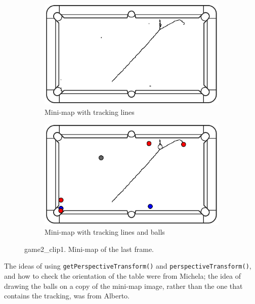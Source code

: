 \begin{figure}[H]
	\centering
	\begin{subfigure}[b]{0.40\textwidth}
		\centering
		\includegraphics[width=\textwidth]{images/Minimap/g2_c1minimap_with_track.jpg}
		\caption{Mini-map with tracking lines}
		\label{fig:game2_clip1_tracking}
	\end{subfigure}
	\begin{subfigure}[b]{0.40\textwidth}
		\centering
		\includegraphics[width=\textwidth]{images/Minimap/g2_c1_minimap_with_balls.jpg}
		\caption{Mini-map with tracking lines and balls}
		\label{fig:game2_clip1_balls}
	\end{subfigure}
	\caption{game2\_clip1. Mini-map of the last frame.}
	\label{fig:game2_clip1_balls_and_tracking}
\end{figure}

The ideas of using \texttt{getPerspectiveTransform()} and \texttt{perspectiveTransform()}, and how to check the orientation of the table were from Michela; the idea of drawing the balls on a copy of the mini-map image, rather than the one that contains the tracking, was from Alberto.
